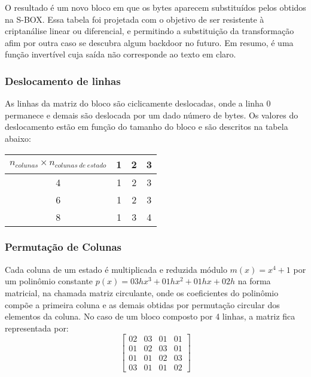 O resultado é um novo bloco em que os bytes aparecem substituídos pelos obtidos na S-BOX. Essa tabela foi projetada com o objetivo de ser resistente à criptanálise linear ou diferencial, e permitindo a substituição da transformação afim por outra caso se descubra algum backdoor no futuro. Em resumo, é uma função invertível cuja saída não corresponde ao texto em claro.

\subsubsection{Deslocamento de linhas}

As linhas da matriz do bloco são ciclicamente deslocadas, onde a linha 0 permanece e demais são deslocada por um dado número de bytes. Os valores do deslocamento estão em função do tamanho do bloco e são descritos na tabela abaixo:
\begin{center}
	\begin{table}[H]
	    \begin{tabular}{|c|c|c|c|}
	    \hline
	    \textbf{$n_{colunas} \times n_{colunas\ de\ estado}$} & \textbf{1} & \textbf{2} & \textbf{3} \\ \hline
	    4                      & 1 & 2 & 3 \\ \hline
	    6                      & 1 & 2 & 3 \\ \hline
	    8                      & 1 & 3 & 4 \\ \hline
	    \end{tabular}
	\end{table}
\end{center}

\subsubsection{Permutação de Colunas}

Cada coluna de um estado é multiplicada e reduzida módulo $m(x) = x^{4} + 1$  por um polinômio constante $p(x) = 03h x^{3} + 01h x^{2}  + 01h x +02h$ na forma matricial, na chamada matriz circulante, onde os coeficientes do polinômio compõe a primeira coluna e as demais obtidas por permutação circular dos elementos da coluna. No caso de um bloco composto por 4 linhas, a matriz fica representada por:
 $$\begin{bmatrix}
 02&03&01&01\\
 01&02&03&01\\
 01&01&02&03\\
 03&01&01&02
 \end{bmatrix}$$

